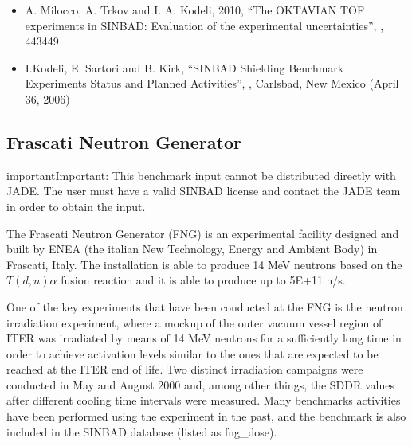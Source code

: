 \documentclass[letterpaper,10pt,english]{sphinxmanual}
\begin{document}


\begin{itemize}
\item {} 
A. Milocco, A. Trkov and I. A. Kodeli, 2010, “The OKTAVIAN TOF experiments in SINBAD: Evaluation of the
experimental uncertainties”, ,  443\sphinxhyphen{}449

\item {} 
I.Kodeli, E. Sartori and B. Kirk, “SINBAD \sphinxhyphen{} Shielding Benchmark Experiments \sphinxhyphen{} Status and Planned Activities”,
,
Carlsbad, New Mexico (April 3\sphinxhyphen{}6, 2006)

\end{itemize}




\subsection{Frascati Neutron Generator}
\label{\detokenize{usage/benchmarks:frascati-neutron-generator}}
\begin{sphinxadmonition}{important}{Important:}
This benchmark input cannot be distributed directly with JADE. The user must have a valid SINBAD
license and contact the JADE team in order to obtain the input.
\end{sphinxadmonition}

The Frascati Neutron Generator (FNG) is an experimental facility designed and built by ENEA
(the italian New Technology, Energy and Ambient Body) in Frascati, Italy. The installation
is able to produce 14 MeV neutrons based on the $T(d,n)\alpha$ fusion reaction and it is able to
produce up to 5E+11 n/s.

One of the key experiments that have been conducted at the FNG is the neutron irradiation
experiment, where a mock\sphinxhyphen{}up of the outer vacuum vessel region of ITER was irradiated by
means of 14 MeV neutrons for a sufficiently long time in order to achieve activation
levels similar to the ones that are expected to be reached at the ITER end of life. Two
distinct irradiation campaigns were conducted in May and August 2000 and, among other
things, the SDDR values after different cooling time intervals were measured.
Many benchmarks activities have been performed using the experiment in the past, and the
benchmark is also included in the SINBAD database (listed as fng\_dose).
\end{document}
